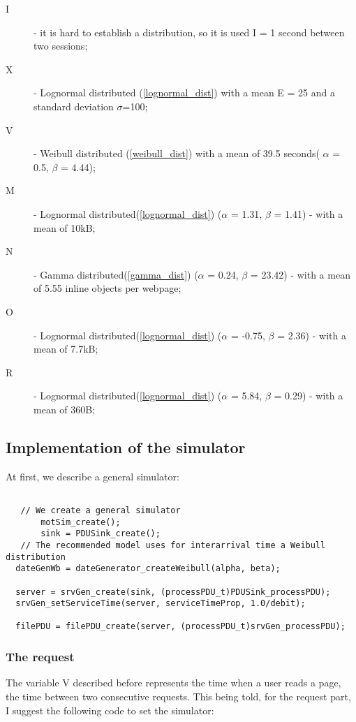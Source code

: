 \begin{description}
 \item[I] - it is hard to establish a distribution, so it is used I = 1 second between two sessions;
 \item[X] - Lognormal distributed (\ref{lognormal_dist}) with a mean E = 25 and a standard deviation $\sigma$=100;
 \item[V] - Weibull distributed (\ref{weibull_dist}) with a mean of 39.5 seconds( $\alpha$ = 0.5, $\beta$ = 4.44);
 \item[M] - Lognormal distributed(\ref{lognormal_dist}) ($\alpha$ = 1.31, $\beta$ = 1.41) - with a mean of 10kB;
 \item[N] - Gamma distributed(\ref{gamma_dist}) ($\alpha$ = 0.24, $\beta$ = 23.42) - with a mean of 5.55 inline objects per webpage;
 \item[O] - Lognormal distributed(\ref{lognormal_dist}) ($\alpha$ = -0.75, $\beta$ = 2.36) - with a mean of 7.7kB;
 \item[R] - Lognormal distributed(\ref{lognormal_dist}) ($\alpha$ = 5.84, $\beta$ = 0.29) - with a mean of 360B;
\end{description}

\subsection{Implementation of the simulator}
At first, we describe a general simulator:
\begin{verbatim}

   // We create a general simulator
       motSim_create();          
       sink = PDUSink_create();
   // The recommended model uses for interarrival time a Weibull distribution
  dateGenWb = dateGenerator_createWeibull(alpha, beta);
  
  server = srvGen_create(sink, (processPDU_t)PDUSink_processPDU);
  srvGen_setServiceTime(server, serviceTimeProp, 1.0/debit); 

  filePDU = filePDU_create(server, (processPDU_t)srvGen_processPDU); 

\end{verbatim}

\subsubsection{The request}

The variable V described before represents the time when a user reads a page, the time between two consecutive requests.
 This being told, for the request part, I suggest the following code to set the simulator:

